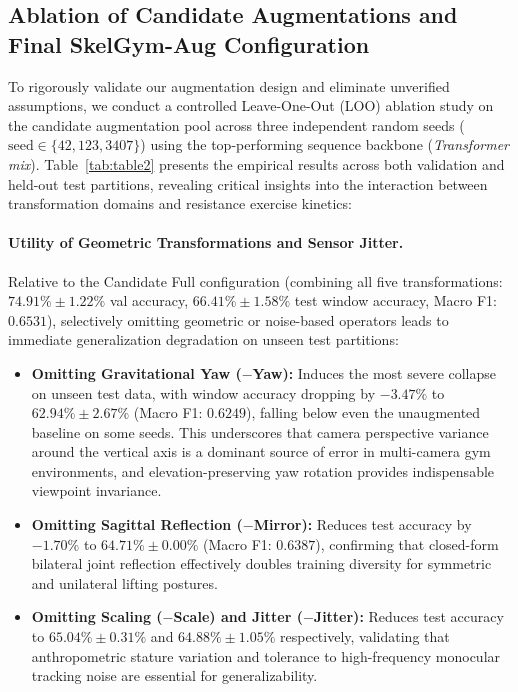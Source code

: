 \documentclass[preprint,12pt]{elsarticle}
\begin{document}
\subsection{Ablation of Candidate Augmentations and Final SkelGym-Aug Configuration}\label{sec:exp_aug}
To rigorously validate our augmentation design and eliminate unverified assumptions, we conduct a controlled Leave-One-Out (LOO) ablation study on the candidate augmentation pool across three independent random seeds ($\text{seed} \in \{42, 123, 3407\}$) using the top-performing sequence backbone (\textit{Transformer mix}). Table~\ref{tab:table2} presents the empirical results across both validation and held-out test partitions, revealing critical insights into the interaction between transformation domains and resistance exercise kinetics:

\paragraph{Utility of Geometric Transformations and Sensor Jitter.} 
Relative to the Candidate Full configuration (combining all five transformations: $74.91\% \pm 1.22\%$ val accuracy, $66.41\% \pm 1.58\%$ test window accuracy, Macro F1: $0.6531$), selectively omitting geometric or noise-based operators leads to immediate generalization degradation on unseen test partitions:
\begin{itemize}
    \item \textbf{Omitting Gravitational Yaw ($-$Yaw):} Induces the most severe collapse on unseen test data, with window accuracy dropping by $-3.47\%$ to $62.94\% \pm 2.67\%$ (Macro F1: $0.6249$), falling below even the unaugmented baseline on some seeds. This underscores that camera perspective variance around the vertical axis is a dominant source of error in multi-camera gym environments, and elevation-preserving yaw rotation provides indispensable viewpoint invariance.
    \item \textbf{Omitting Sagittal Reflection ($-$Mirror):} Reduces test accuracy by $-1.70\%$ to $64.71\% \pm 0.00\%$ (Macro F1: $0.6387$), confirming that closed-form bilateral joint reflection effectively doubles training diversity for symmetric and unilateral lifting postures.
    \item \textbf{Omitting Scaling ($-$Scale) and Jitter ($-$Jitter):} Reduces test accuracy to $65.04\% \pm 0.31\%$ and $64.88\% \pm 1.05\%$ respectively, validating that anthropometric stature variation and tolerance to high-frequency monocular tracking noise are essential for generalizability.
\end{itemize}
\end{document}
